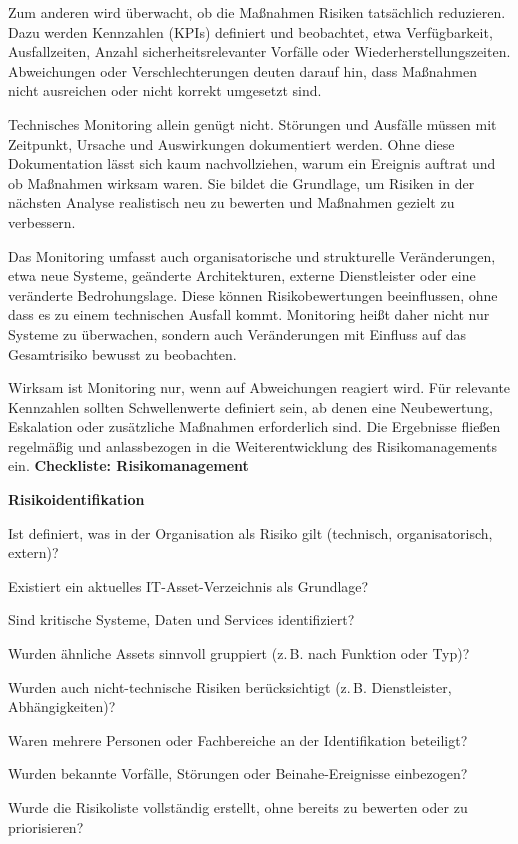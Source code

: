Zum anderen wird überwacht, ob die Maßnahmen Risiken tatsächlich reduzieren. Dazu werden Kennzahlen (KPIs) definiert und beobachtet, etwa Verfügbarkeit, Ausfallzeiten, Anzahl sicherheitsrelevanter Vorfälle oder Wiederherstellungszeiten. Abweichungen oder Verschlechterungen deuten darauf hin, dass Maßnahmen nicht ausreichen oder nicht korrekt umgesetzt sind.

Technisches Monitoring allein genügt nicht. Störungen und Ausfälle müssen mit Zeitpunkt, Ursache und Auswirkungen dokumentiert werden. Ohne diese Dokumentation lässt sich kaum nachvollziehen, warum ein Ereignis auftrat und ob Maßnahmen wirksam waren. Sie bildet die Grundlage, um Risiken in der nächsten Analyse realistisch neu zu bewerten und Maßnahmen gezielt zu verbessern.

Das Monitoring umfasst auch organisatorische und strukturelle Veränderungen, etwa neue Systeme, geänderte Architekturen, externe Dienstleister oder eine veränderte Bedrohungslage. Diese können Risikobewertungen beeinflussen, ohne dass es zu einem technischen Ausfall kommt. Monitoring heißt daher nicht nur Systeme zu überwachen, sondern auch Veränderungen mit Einfluss auf das Gesamtrisiko bewusst zu beobachten.

Wirksam ist Monitoring nur, wenn auf Abweichungen reagiert wird. Für relevante Kennzahlen sollten Schwellenwerte definiert sein, ab denen eine Neubewertung, Eskalation oder zusätzliche Maßnahmen erforderlich sind. Die Ergebnisse fließen regelmäßig und anlassbezogen in die Weiterentwicklung des Risikomanagements ein.
\newpage
\textbf{Checkliste: Risikomanagement}
\vspace{1em}

\textbf{Risikoidentifikation}
\begin{checklist}
  \item Ist definiert, was in der Organisation als Risiko gilt (technisch, organisatorisch, extern)?
  \item Existiert ein aktuelles IT-Asset-Verzeichnis als Grundlage?
  \item Sind kritische Systeme, Daten und Services identifiziert?
  \item Wurden ähnliche Assets sinnvoll gruppiert (z.\,B. nach Funktion oder Typ)?
  \item Wurden auch nicht-technische Risiken berücksichtigt (z.\,B. Dienstleister, Abhängigkeiten)?
  \item Waren mehrere Personen oder Fachbereiche an der Identifikation beteiligt?
  \item Wurden bekannte Vorfälle, Störungen oder Beinahe-Ereignisse einbezogen?
  \item Wurde die Risikoliste vollständig erstellt, ohne bereits zu bewerten oder zu priorisieren?
\end{checklist}
\vspace{1em}

